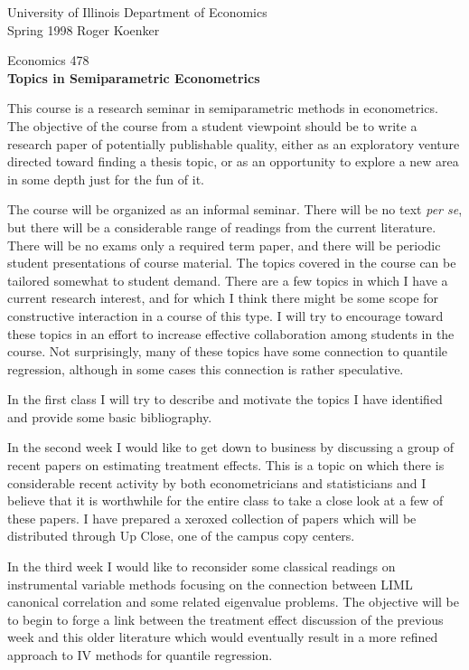 




\noindent
University of Illinois \hfill Department of Economics \\
Spring 1998 \hfill Roger Koenker
\begin{center}
\large{
{ Economics 478 \\
{\bf Topics in Semiparametric Econometrics}}}
\end{center}

\vspace{3mm}
This course is a research seminar in semiparametric methods in
econometrics.  The objective of the course from a student viewpoint
should be to write a research paper of potentially publishable quality,
either as an exploratory venture directed toward finding a thesis topic,
or as an opportunity to explore a new area in some depth just for the
fun of it.

The course will be organized as an informal seminar.  
There will be no text 
{\em per se}, but there will be a considerable range of readings from the 
current literature.  
There will be no exams only a required term paper,
and there will be periodic student presentations of course material.
The topics covered in the course can be tailored somewhat to student
demand.  There are a few topics in which I have a current research interest,
and for which I think there might be some scope for constructive interaction 
in a course of this type.  I will try to encourage toward these topics
in an effort to increase effective collaboration among students in the
course.  Not surprisingly, many of these topics have some connection
to quantile regression, although in some cases this connection is rather
speculative.

In the first class I will try to describe and motivate the topics I have
identified and provide some basic bibliography.

In the second week I would like to get down to business by discussing
a group of recent papers on estimating treatment effects.  This is a
topic on which there is considerable recent activity by both econometricians
and statisticians and I believe that it is worthwhile for the entire class
to take a close look at a few of these papers.  I have prepared a xeroxed
collection of papers which will be distributed through Up Close, 
one of the campus copy centers.  

In the third week I would like to reconsider some classical readings on
instrumental variable methods focusing on the connection between LIML
canonical correlation and some related eigenvalue problems.  The objective
will be to begin to forge a link between the treatment effect discussion
of the previous week and this older literature which would eventually
result in a more refined approach to IV methods for quantile regression.

